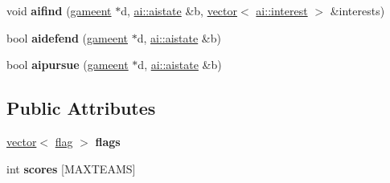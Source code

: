 \begin{DoxyCompactItemize}
\item 
\mbox{\label{structgame_1_1ctfclientmode_ad5c6c673e6d916889c076049c6d74b4a}} 
void {\bfseries aifind} (\hyperlink{structgameent}{gameent} $\ast$d, \hyperlink{structai_1_1aistate}{ai\+::aistate} \&b, \hyperlink{structvector}{vector}$<$ \hyperlink{structai_1_1interest}{ai\+::interest} $>$ \&interests)
\item 
\mbox{\label{structgame_1_1ctfclientmode_ac9879571630083b936dff8d16c17365f}} 
bool {\bfseries aidefend} (\hyperlink{structgameent}{gameent} $\ast$d, \hyperlink{structai_1_1aistate}{ai\+::aistate} \&b)
\item 
\mbox{\label{structgame_1_1ctfclientmode_abd8e5581ec9eb7dbe480e1db06112581}} 
bool {\bfseries aipursue} (\hyperlink{structgameent}{gameent} $\ast$d, \hyperlink{structai_1_1aistate}{ai\+::aistate} \&b)
\end{DoxyCompactItemize}
\subsection*{Public Attributes}
\begin{DoxyCompactItemize}
\item 
\mbox{\label{structgame_1_1ctfclientmode_a37e3b3b1fa51ca28f2eb23b328abe47f}} 
\hyperlink{structvector}{vector}$<$ \hyperlink{structgame_1_1ctfclientmode_1_1flag}{flag} $>$ {\bfseries flags}
\item 
\mbox{\label{structgame_1_1ctfclientmode_a9ec552f3ec2abc8cf9bdb57f70d4ccdc}} 
int {\bfseries scores} \mbox{[}M\+A\+X\+T\+E\+A\+MS\mbox{]}
\end{DoxyCompactItemize}
